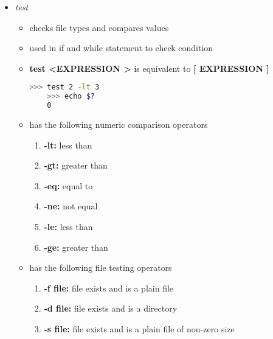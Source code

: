 \documentclass[12pt]{article}
\begin{document}
\begin{itemize}
    \item \textit{test}
    \begin{itemize}
    \item checks file types and compares values
    \item used in if and while statement to check condition
    \item \textbf{test \textless EXPRESSION \textgreater} is equivalent to
    \textbf{[ EXPRESSION ]}

    \begin{lstlisting}[language=bash]
    >>> test 2 -lt 3
    >>> echo $?
    0
    \end{lstlisting}

    \item has the following numeric comparison operators
    \begin{enumerate}[1.]
    \item \textbf{-lt:} less than
    \item \textbf{-gt:} greater than
    \item \textbf{-eq:} equal to
    \item \textbf{-ne:} not equal
    \item \textbf{-le:} less than
    \item \textbf{-ge:} greater than
    \end{enumerate}

    \item has the following file testing operators
    \begin{enumerate}[1.]
    \item \textbf{-f file:} file exists and is a plain file
    \item \textbf{-d file:} file exists and is a directory
    \item \textbf{-s file:} file exists and is a plain file of non-zero size
    \end{enumerate}

    \end{itemize}

\end{itemize}
\end{document}
